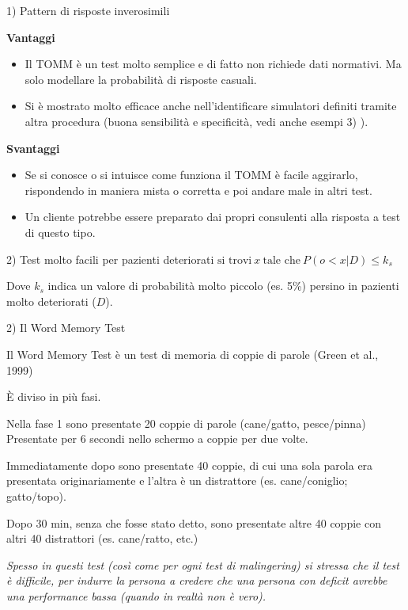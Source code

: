 \documentclass[
  ignorenonframetext,
  aspectratio=169,
]{beamer}
\providecommand{\tightlist}{%
  \setlength{\itemsep}{0pt}\setlength{\parskip}{0pt}}
\begin{document}
\begin{frame}{1) Pattern di risposte inverosimili}
\label{pattern-di-risposte-inverosimili-1}
\small

\textbf{Vantaggi}

\begin{itemize}
\tightlist
\item
  Il TOMM è un test molto semplice e di fatto non richiede dati
  normativi. Ma solo modellare la probabilità di risposte casuali.
\item
  Si è mostrato molto efficace anche nell'identificare simulatori
  definiti tramite altra procedura (buona sensibilità e specificità,
  vedi anche esempi 3) ).
\end{itemize}

\textbf{Svantaggi}

\begin{itemize}
\tightlist
\item
  Se si conosce o si intuisce come funziona il TOMM è facile aggirarlo,
  rispondendo in maniera mista o corretta e poi andare male in altri
  test.
\item
  Un cliente potrebbe essere preparato dai propri consulenti alla
  risposta a test di questo tipo.
\end{itemize}
\end{frame}

\begin{frame}{2) Test molto facili per pazienti deteriorati}
\label{test-molto-facili-per-pazienti-deteriorati}
\vfill
{\center
$\text{si trovi}\ x\ \text{tale che}\ P(o < x | D) \leq k_s$
\vfill
}

Dove \(k_s\) indica un valore di probabilità molto piccolo (es. 5\%)
persino in pazienti molto deteriorati (\(D\)).
\end{frame}

\begin{frame}{2) Il Word Memory Test}
\label{il-word-memory-test}
\small

Il Word Memory Test è un test di memoria di coppie di parole (Green et
al., 1999)

È diviso in più fasi.

Nella fase 1 sono presentate 20 coppie di parole (cane/gatto,
pesce/pinna) Presentate per 6 secondi nello schermo a coppie per due
volte.

Immediatamente dopo sono presentate 40 coppie, di cui una sola parola
era presentata originariamente e l'altra è un distrattore (es.
cane/coniglio; gatto/topo).

Dopo 30 min, senza che fosse stato detto, sono presentate altre 40
coppie con altri 40 distrattori (es. cane/ratto, etc.)

\emph{Spesso in questi test (così come per ogni test di malingering) si
stressa che il test è difficile, per indurre la persona a credere che
una persona con deficit avrebbe una performance bassa (quando in realtà
non è vero).}
\end{frame}
\end{document}
